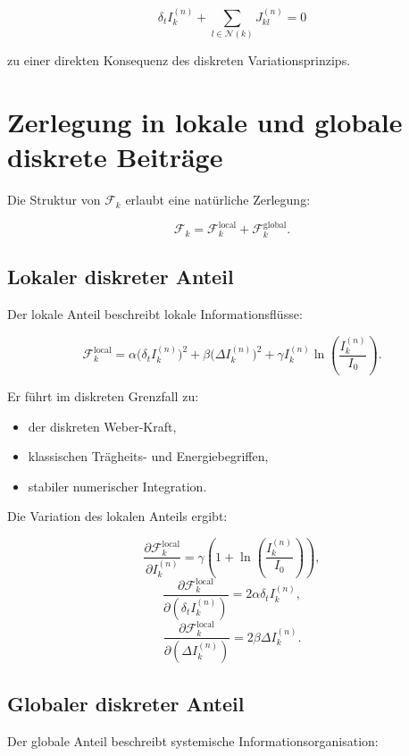 \[
\delta_t I_k^{(n)} + \sum_{l \in \mathcal{N}(k)} J_{kl}^{(n)} = 0
\]

zu einer direkten Konsequenz des diskreten Variationsprinzips.

\section{Zerlegung in lokale und globale diskrete Beiträge}
\label{sec:lokal_global_zerlegung}

Die Struktur von \( \mathcal{F}_k \) erlaubt eine natürliche Zerlegung:

\[
\mathcal{F}_k = \mathcal{F}_k^{\text{local}} + \mathcal{F}_k^{\text{global}}.
\]

\subsection{Lokaler diskreter Anteil}
\label{sub:lokaler_anteil}

Der lokale Anteil beschreibt lokale Informationsflüsse:

\[
\mathcal{F}_k^{\text{local}} = \alpha \bigl( \delta_t I_k^{(n)} \bigr)^2 + \beta \bigl( \Delta I_k^{(n)} \bigr)^2 + \gamma I_k^{(n)} \ln \left( \frac{I_k^{(n)}}{I_0} \right).
\]

Er führt im diskreten Grenzfall zu:

\begin{itemize}
    \item der diskreten Weber-Kraft,
    \item klassischen Trägheits- und Energiebegriffen,
    \item stabiler numerischer Integration.
\end{itemize}

Die Variation des lokalen Anteils ergibt:

\[
\frac{\partial \mathcal{F}_k^{\text{local}}}{\partial I_k^{(n)}} = \gamma \left( 1 + \ln \left( \frac{I_k^{(n)}}{I_0} \right) \right),
\]
\[
\frac{\partial \mathcal{F}_k^{\text{local}}}{\partial (\delta_t I_k^{(n)})} = 2\alpha \delta_t I_k^{(n)},
\]
\[
\frac{\partial \mathcal{F}_k^{\text{local}}}{\partial (\Delta I_k^{(n)})} = 2\beta \Delta I_k^{(n)}.
\]

\subsection{Globaler diskreter Anteil}
\label{sub:globaler_anteil}

Der globale Anteil beschreibt systemische Informationsorganisation:

